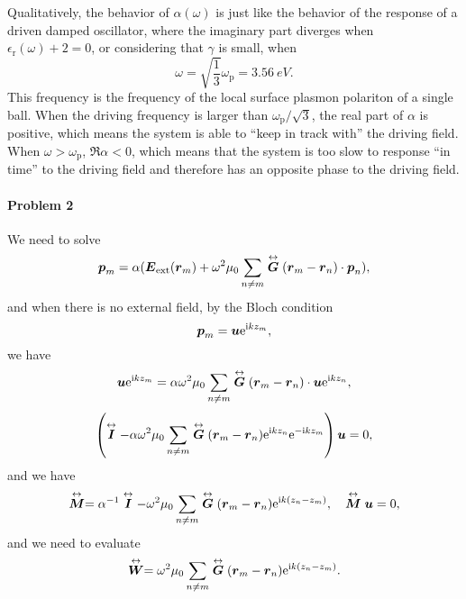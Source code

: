 \documentclass[hyperref, a4paper]{article}
\newcommand*{\ii}{\mathrm{i}}
\newcommand*{\ee}{\mathrm{e}}
\renewcommand{\tensor}[1]{ \stackrel{\leftrightarrow}{\vb*{#1}}}
\begin{document}
Qualitatively, the behavior 
of $\alpha(\omega)$ is just like the behavior of the response of a driven damped oscillator, where the imaginary 
part diverges when $\epsilon_\text{r}(\omega) + 2 = 0$, or considering that $\gamma$ is small, when 
\begin{equation}
    \omega = \sqrt{\frac{1}{3}} \omega_\text{p} = \SI{3.56}{eV}.
\end{equation}
This frequency is the frequency of the local surface plasmon polariton of a single ball.
When the driving frequency is larger than $\omega_\text{p} / \sqrt{3}$, the real part of $\alpha$ is positive, 
which means the system is able to ``keep in track with'' the driving field. When $\omega > \omega_\text{p}$,
$\Re \alpha < 0$, which means that the system is too slow to response ``in time'' to the driving field and 
therefore has an opposite phase to the driving field.

\paragraph{}

\paragraph{Problem 2} We need to solve 
\begin{equation}
    \vb*{p}_m = \alpha (\vb*{E}_\text{ext}(\vb*{r}_m) + \omega^2 \mu_0 \sum_{n \neq m} \tensor{\vb*{G}}(\vb*{r}_m - \vb*{r}_n) \cdot \vb*{p}_n),
    \label{eq:p-ext}
\end{equation}
and when there is no external field, by the Bloch condition 
\begin{equation}
    \vb*{p}_m = \vb*{u} \ee^{\ii k z_m},
\end{equation}
we have 
\[
    \vb*{u} \ee^{\ii k z_m} = \alpha \omega^2 \mu_0 \sum_{n \neq m} \tensor{\vb*{G}}(\vb*{r}_m - \vb*{r}_n) \cdot \vb*{u} \ee^{\ii k z_n},
\]
\[
    \left( \tensor{\vb*{I}} - \alpha \omega^2 \mu_0 \sum_{n \neq m} \tensor{\vb*{G}}(\vb*{r}_m - \vb*{r}_n) \ee^{\ii k z_n} \ee^{- \ii k z_m}  \right) \vb*{u}  = 0,
\]
and we have 
\begin{equation}
    \tensor{\vb*{M}} = \alpha^{-1} \tensor{ \vb*{I}} - \omega^2 \mu_0 \sum_{n \neq m} \tensor{\vb*{G}}(\vb*{r}_m - \vb*{r}_n) \ee^{\ii k (z_n - z_m)}, \quad \tensor{\vb*{M}} \vb*{u} = 0,
    \label{eq:eigen-problem}
\end{equation}
and we need to evaluate 
\begin{equation}
    \tensor{\vb*{W}} = \omega^2 \mu_0 \sum_{n \neq m} \tensor{\vb*{G}}(\vb*{r}_m - \vb*{r}_n) \ee^{\ii k (z_n - z_m)}.
    \label{eq:def-w}
\end{equation}
\end{document}
